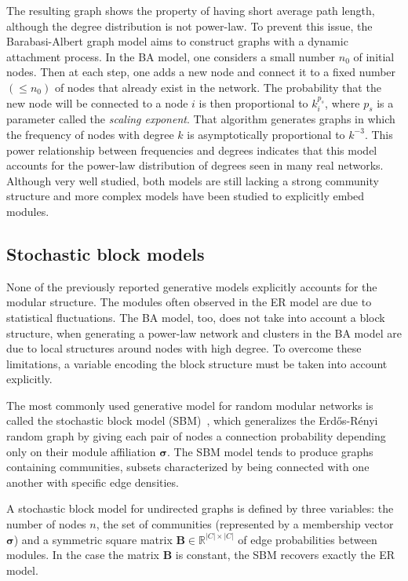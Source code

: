 \documentclass[11pt,              a4paper,              twoside,openright,              titlepage,              headinclude,footinclude,                            numbers=noenddot,              cleardoublepage=empty,]{scrreprt}
\begin{document}
The resulting graph shows the property of having short average path length, although the degree distribution is not power-law.
To prevent this issue, the Barabasi-Albert graph model aims to construct graphs with a dynamic attachment process.
In the BA model, one considers a small number $n_0$ of initial nodes.
Then at each step, one adds a new node and connect it to a fixed number $(\leq n_0)$ of nodes that already exist in the network.
The probability that the new node will be connected to a node $i$ is then proportional to $k_i^{p_s}$,  where $p_s$ is a parameter called the \emph{scaling exponent}.
That algorithm generates graphs in which the frequency of nodes with degree $k$ is asymptotically proportional to ${k}^{-3}$.
This power relationship between frequencies and degrees indicates that this model accounts for the power-law distribution of degrees seen in many real networks.
Although very well studied, both models are still lacking a strong community structure and more complex models have been studied to explicitly embed modules.

\subsection{Stochastic block models}
None of the previously reported generative models explicitly accounts for the modular structure.
The modules often observed in the ER model are due to statistical fluctuations.
The BA model, too, does not take into account a block structure, when generating a power-law network and clusters in the BA model are due to local structures around nodes with high degree.
To overcome these limitations, a variable encoding the block structure must be taken into account explicitly.

The most commonly used generative model for random modular networks is called the stochastic block model (SBM)~\cite{holland1983}, which generalizes the Erd\H{o}s-Rényi random graph by giving each pair of nodes a connection probability depending only on their module affiliation $\boldsymbol \sigma$.
The SBM model tends to produce graphs containing communities, subsets characterized by being connected with one another with specific edge densities.

A stochastic block model for undirected graphs is defined by three variables: the number of nodes $n$, the set of communities (represented by a membership vector $\boldsymbol \sigma$) and a symmetric square matrix  $\mathbf{B} \in \mathbb{R}^{|C| \times |C|}$ of edge probabilities between modules.
In the case the matrix $\mathbf{B}$ is constant, the SBM recovers exactly the ER model.
\end{document}
